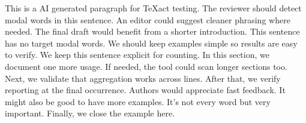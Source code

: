 \documentclass{article}
\begin{document}
This is a AI generated paragraph for TeXact testing.
The reviewer should detect modal words in this sentence.
An editor could suggest cleaner phrasing where needed.
The final draft would benefit from a shorter introduction.
This sentence has no target modal words.
We should keep examples simple so results are easy to verify.
We keep this sentence explicit for counting.
In this section, we document one more usage.
If needed, the tool could scan longer sections too.
Next, we validate that aggregation works across lines.
After that, we verify reporting at the final occurrence.
Authors would appreciate fast feedback.
It might also be good to have more examples.
It's not every word but very important.
Finally, we close the example here.
\end{document}
